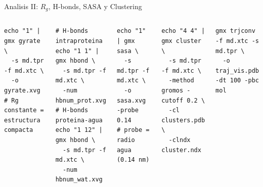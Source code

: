 \documentclass[aspectratio=169, 10pt]{beamer}
\begin{document}
\begin{frame}[fragile,shrink=16]{Analisis II: $R_g$, H-bonds, SASA y Clustering}
\begin{columns}[T]
\begin{tcolorbox}[definitionbox, title={Radio de giro ($R_g$)}]
\begin{lstlisting}[style=bashstyle]
echo "1" | gmx gyrate \
  -s md.tpr -f md.xtc \
  -o gyrate.xvg
# Rg constante = estructura compacta
\end{lstlisting}
\end{tcolorbox}
\begin{tcolorbox}[definitionbox, title={Puentes de hidrogeno}]
\begin{lstlisting}[style=bashstyle]
# H-bonds intraproteina
echo "1 1" | gmx hbond \
  -s md.tpr -f md.xtc \
  -num hbnum_prot.xvg
# H-bonds proteina-agua
echo "1 12" | gmx hbond \
  -s md.tpr -f md.xtc \
  -num hbnum_wat.xvg
\end{lstlisting}
\end{tcolorbox}
\column{0.47\textwidth}
\begin{tcolorbox}[definitionbox, title={SASA (superficie accesible)}]
\begin{lstlisting}[style=bashstyle]
echo "1" | gmx sasa \
  -s md.tpr -f md.xtc \
  -o sasa.xvg -probe 0.14
# probe = radio agua (0.14 nm)
\end{lstlisting}
\end{tcolorbox}
\begin{tcolorbox}[definitionbox, title={Clustering de conformaciones}]
\begin{lstlisting}[style=bashstyle]
echo "4 4" | gmx cluster \
  -s md.tpr -f md.xtc \
  -method gromos -cutoff 0.2 \
  -cl clusters.pdb \
  -clndx cluster.ndx
\end{lstlisting}
\end{tcolorbox}
\begin{tcolorbox}[warningbox, title={Visualizacion con VMD/PyMOL}]
\begin{lstlisting}[style=bashstyle]
gmx trjconv -f md.xtc -s md.tpr \
  -o traj_vis.pdb -dt 100 -pbc mol
\end{lstlisting}
\end{tcolorbox}
\end{columns}
\end{frame}

\end{document}
